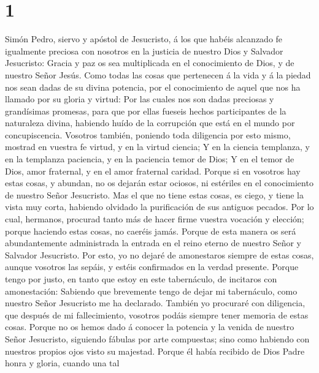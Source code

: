 \hypertarget{section}{%
\section{1}\label{section}}

 Simón Pedro, siervo y apóstol de Jesucristo, á los que
habéis alcanzado fe igualmente preciosa con nosotros en la justicia de
nuestro Dios y Salvador Jesucristo:  Gracia y paz os sea
multiplicada en el conocimiento de Dios, y de nuestro Señor Jesús.
 Como todas las cosas que pertenecen á la vida y á la piedad
nos sean dadas de su divina potencia, por el conocimiento de aquel que
nos ha llamado por su gloria y virtud:  Por las cuales nos
son dadas preciosas y grandísimas promesas, para que por ellas fueseis
hechos participantes de la naturaleza divina, habiendo huído de la
corrupción que está en el mundo por concupiscencia. 
Vosotros también, poniendo toda diligencia por esto mismo, mostrad en
vuestra fe virtud, y en la virtud ciencia;  Y en la ciencia
templanza, y en la templanza paciencia, y en la paciencia temor de Dios;
 Y en el temor de Dios, amor fraternal, y en el amor
fraternal caridad.  Porque si en vosotros hay estas cosas, y
abundan, no os dejarán estar ociosos, ni estériles en el conocimiento de
nuestro Señor Jesucristo.  Mas el que no tiene estas cosas,
es ciego, y tiene la vista muy corta, habiendo olvidado la purificación
de sus antiguos pecados.  Por lo cual, hermanos, procurad
tanto más de hacer firme vuestra vocación y elección; porque haciendo
estas cosas, no caeréis jamás.  Porque de esta manera os
será abundantemente administrada la entrada en el reino eterno de
nuestro Señor y Salvador Jesucristo.  Por esto, yo no
dejaré de amonestaros siempre de estas cosas, aunque vosotros las
sepáis, y estéis confirmados en la verdad presente.  Porque
tengo por justo, en tanto que estoy en este tabernáculo, de incitaros
con amonestación:  Sabiendo que brevemente tengo de dejar
mi tabernáculo, como nuestro Señor Jesucristo me ha declarado.
 También yo procuraré con diligencia, que después de mi
fallecimiento, vosotros podáis siempre tener memoria de estas cosas.
 Porque no os hemos dado á conocer la potencia y la venida
de nuestro Señor Jesucristo, siguiendo fábulas por arte compuestas; sino
como habiendo con nuestros propios ojos visto su majestad. 
Porque él había recibido de Dios Padre honra y gloria, cuando una tal
